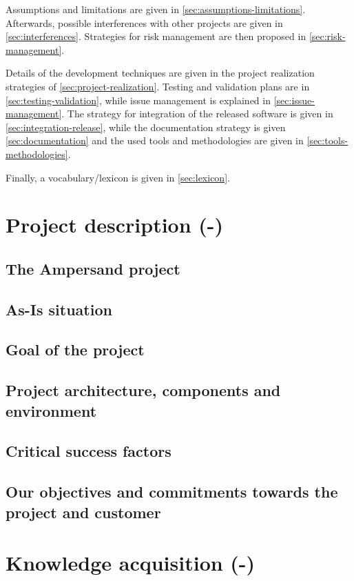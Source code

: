 \documentclass[a4paper,12pt,abstracton,titlepage]{scrartcl}
\begin{document}
Assumptions and limitations are given in \autoref{sec:assumptions-limitations}.
Afterwards, possible interferences with other projects are given in \autoref{sec:interferences}.
Strategies for risk management are then proposed in \autoref{sec:risk-management}.

Details of the development techniques are given in the project realization strategies of \autoref{sec:project-realization}.
Testing and validation plans are in \autoref{sec:testing-validation}, while issue management is explained in \autoref{sec:issue-management}.
The strategy for integration of the released software is given in \autoref{sec:integration-release}, while the documentation strategy is given \autoref{sec:documentation} and the used tools and methodologies are given in \autoref{sec:tools-methodologies}.

Finally, a vocabulary/lexicon is given in \autoref{sec:lexicon}.

\section{Project description (-)}
\label{sec:project-description}
\subsection{The Ampersand project}
\subsection{As-Is situation}
\subsection{Goal of the project}
\subsection{Project architecture, components and environment}
\subsection{Critical success factors}
\subsection{Our objectives and commitments towards the project and customer}

\section{Knowledge acquisition (-)}
\label{sec:knowledge-acquisition}
\end{document}
